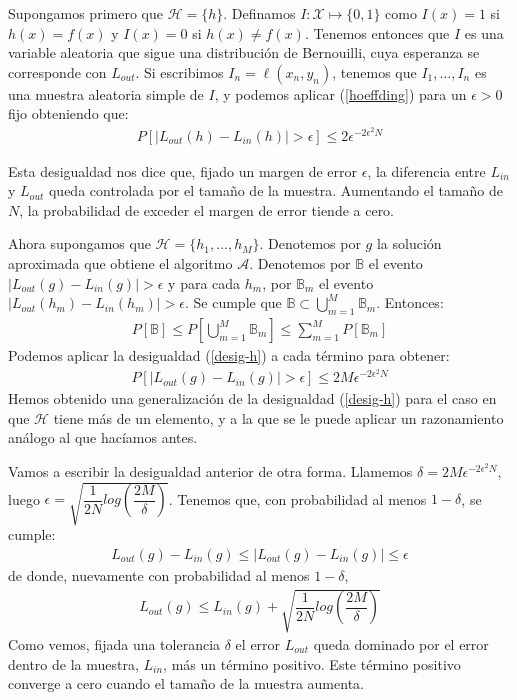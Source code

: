 Supongamos primero que $\mathcal{H} = \{ h \}$. Definamos $I: \mathcal{X} \mapsto \{0,1\}$ como $I(x)=1$ si $h(x) = f(x)$ y $I(x) = 0$ si $h(x) \neq f(x)$. Tenemos entonces que $I$ es una variable aleatoria que sigue una distribución de Bernouilli, cuya esperanza se corresponde con $L_{out}$. Si escribimos $I_n=\ell(x_n, y_n)$, tenemos que $I_1, \ldots, I_n$ es una muestra aleatoria simple de $I$, y podemos aplicar (\ref{hoeffding}) para un $\epsilon > 0$ fijo obteniendo que:
\begin{align}\label{desig-h}
	P[ |L_{out}(h) - L_{in}(h)| > \epsilon  ] \leq 2 \epsilon^{-2 \epsilon^2 N}
\end{align}

Esta desigualdad nos dice que, fijado un margen de error $\epsilon$, la diferencia entre $L_{in}$ y $L_{out}$ queda controlada por el tamaño de la muestra. Aumentando el tamaño de $N$, la probabilidad de exceder el margen de error tiende a cero. 

Ahora supongamos que $\mathcal{H} = \{h_1, \ldots, h_M\}$. Denotemos por $g$ la solución aproximada que obtiene el algoritmo $\mathcal{A}$. Denotemos por $\mathbb{B}$ el evento $|L_{out}(g) - L_{in}(g)| > \epsilon$ y para cada $h_m$, por $\mathbb{B}_m$ el evento $|L_{out}(h_m) - L_{in}(h_m)| > \epsilon$. Se cumple que $ \mathbb{B} \subset \bigcup_{m=1}^{M} \mathbb{B}_m$. Entonces:
\begin{align*}
	P[\mathbb{B}] \leq P[\bigcup_{m=1}^{M} \mathbb{B}_m ] \leq \sum_{m=1}^{M} P[ \mathbb{B}_m ]
\end{align*}
Podemos aplicar la desigualdad (\ref{desig-h}) a cada término para obtener:
\begin{align*}
	P[ |L_{out}(g) - L_{in}(g)| > \epsilon ] \leq 2 M \epsilon^{-2 \epsilon^2 N}
\end{align*}
Hemos obtenido una generalización de la desigualdad (\ref{desig-h}) para el caso en que $\mathcal{H}$ tiene más de un elemento, y a la que se le puede aplicar un razonamiento análogo al que hacíamos antes. 

Vamos a escribir la desigualdad anterior de otra forma. Llamemos $\delta = 2 M \epsilon^{-2 \epsilon^2 N}$, luego $\epsilon = \sqrt{ \dfrac{1}{2N} log \left( \dfrac{2M}{\delta} \right) }$. Tenemos que, con probabilidad al menos $1-\delta$, se cumple:
\begin{align*}
	L_{out}(g) - L_{in}(g) \leq |L_{out}(g) - L_{in}(g)| \leq \epsilon
\end{align*}
de donde, nuevamente con probabilidad al menos $1-\delta$,
\begin{align}\label{desig_gen_1}
	L_{out}(g) \leq L_{in}(g) + \sqrt{ \dfrac{1}{2N} log \left( \dfrac{2M}{\delta} \right) }
\end{align}
Como vemos, fijada una tolerancia $\delta$ el error $L_{out}$ queda dominado por el error dentro de la muestra, $L_{in}$, más un término positivo. Este término positivo converge a cero cuando el tamaño de la muestra aumenta.


